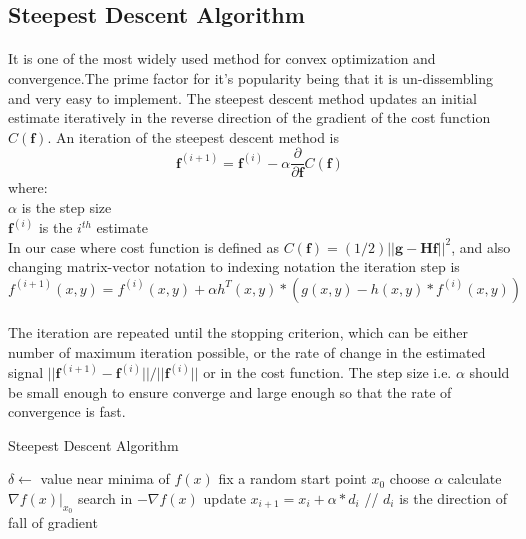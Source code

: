 \documentclass[a4paper]{book}
\newcommand{\pder}[2][]{\frac{\partial#1}{\partial#2}}
\begin{document}
\subsection{Steepest Descent Algorithm}
\paragraph*{}It is one of the most widely used method for convex optimization and convergence.The prime factor for it's popularity being that it is un-dissembling and very easy to implement. The steepest descent method updates an initial estimate iteratively in the reverse direction of the gradient of the cost function $ C(\textbf{f}) $. An iteration of the steepest descent method is 
\begin{equation}
\label{eq3.5}
\textbf{f}^{(i+1)}=\textbf{f}^{(i)} - \alpha \pder{\textbf{f}}{C(\textbf{f})} 
\end{equation}
where:\\ $ \alpha $ is the step size \\ $ \textbf{f}^{(i)} $ is the $ i^{th} $ estimate\\

In our case where cost function is defined as $C(\textbf{f})=(1/2)||\textbf{g}-\textbf{Hf}||^{2}$, and also changing matrix-vector notation to indexing notation the iteration step is 
\begin{equation}
\label{eq3.6}
f^{(i+1)}(x,y) = f^{(i)}(x,y) + \alpha h^{T}(x,y)*(g(x,y)-h(x,y)*f^{(i)}(x,y))
\end{equation}
\paragraph*{}The iteration are repeated until the stopping criterion, which can be either number of maximum iteration possible, or the rate of change in the estimated signal $ ||\textbf{f}^{(i+1)} - \textbf{f}^{(i)}||/||\textbf{f}^{(i)}||$ or in the cost function. The step size i.e. $ \alpha $ should be small enough to ensure converge and large enough so that the rate of convergence is fast.
\begin{algorithm}[h!]
	\caption{Steepest Descent Algorithm}
	\label{alg1}
	\begin{algorithmic}
		\STATE $ \delta \leftarrow$ value near minima of  $f(x) $ 
		\STATE fix a random start point  $ x_{0} $
		\STATE choose  $ \alpha $ 
		\STATE	calculate $ \nabla f(x) |_{x_{0}}$
		\STATE search in $ - \nabla f(x)$
		\STATE update $ x_{i+1} = x_{i} + \alpha*d_{i} $  // $ d_{i} $  is the direction of fall of gradient
		\ENDIF
		\end{algorithmic}
	
\end{algorithm}
\end{document}
